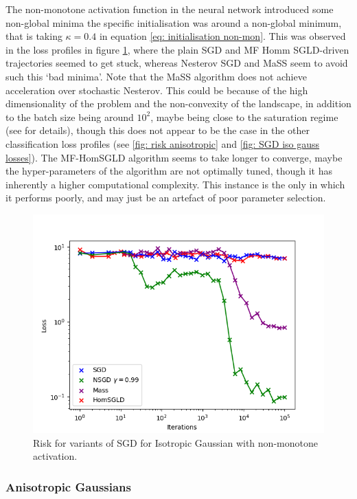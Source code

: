 \documentclass{article}
\begin{document}
The non-monotone activation function in the neural network introduced some non-global minima the specific initialisation was around a non-global minimum, that is taking $ \kappa = 0.4$ in equation \ref{eq: initialisation non-mon}. This was observed in the loss profiles in figure \ref{fig: sgd risk iso gauss non-monotone}, where the plain SGD and MF Homm SGLD-driven trajectories seemed to get stuck, whereas Nesterov SGD and MaSS seem to avoid such this ‘bad minima’. Note that the MaSS algorithm does not achieve acceleration over stochastic Nesterov. This could be because of the high dimensionality of the problem and the non-convexity of the landscape, in addition to the batch size being around $ 10^2$, maybe being close to the saturation regime (see \cite{liu2019acceleratingsgdmomentumoverparameterized} for details), though this does not appear to be the case in the other classification loss profiles (see \ref{fig: risk anisotropic} and \ref{fig: SGD iso gauss losses}). The  MF-HomSGLD algorithm seems to take longer to converge, maybe the hyper-parameters of the algorithm are not optimally tuned, though it has inherently a higher computational complexity. This instance is the only in which it performs poorly, and may just be an artefact of poor parameter selection. 


\begin{figure}[H]
    \centering
    \includegraphics[width=0.8\linewidth]{images/Nguyen2018-SGD-algos-risk-iso-gauss-non-mon.png}
    \caption{Risk for variants of SGD for Isotropic Gaussian with non-monotone activation.}
    \label{fig: sgd risk iso gauss non-monotone}
\end{figure}

\subsubsection{Anisotropic Gaussians}
\end{document}
